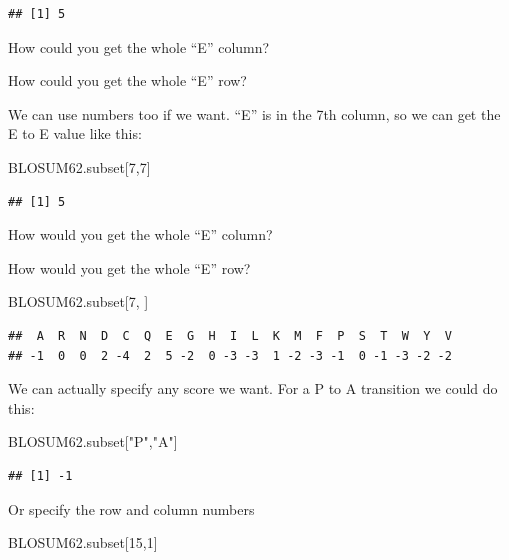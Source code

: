 \documentclass[
]{book}
\newenvironment{Shaded}{\begin{snugshade}}{\end{snugshade}}
\newcommand{\DecValTok}[1]{\textcolor[rgb]{0.00,0.00,0.81}{#1}}
\newcommand{\NormalTok}[1]{#1}
\newcommand{\StringTok}[1]{\textcolor[rgb]{0.31,0.60,0.02}{#1}}
\begin{document}
\begin{verbatim}
## [1] 5
\end{verbatim}

How could you get the whole ``E'' column?

How could you get the whole ``E'' row?

We can use numbers too if we want. ``E'' is in the 7th column, so we can get the E to E value like this:

\begin{Shaded}
\begin{Highlighting}[]
\NormalTok{BLOSUM62.subset[}\DecValTok{7}\NormalTok{,}\DecValTok{7}\NormalTok{]}
\end{Highlighting}
\end{Shaded}

\begin{verbatim}
## [1] 5
\end{verbatim}

How would you get the whole ``E'' column?

How would you get the whole ``E'' row?

\begin{Shaded}
\begin{Highlighting}[]
\NormalTok{BLOSUM62.subset[}\DecValTok{7}\NormalTok{, ]}
\end{Highlighting}
\end{Shaded}

\begin{verbatim}
##  A  R  N  D  C  Q  E  G  H  I  L  K  M  F  P  S  T  W  Y  V 
## -1  0  0  2 -4  2  5 -2  0 -3 -3  1 -2 -3 -1  0 -1 -3 -2 -2
\end{verbatim}

We can actually specify any score we want. For a P to A transition we could do this:

\begin{Shaded}
\begin{Highlighting}[]
\NormalTok{BLOSUM62.subset[}\StringTok{"P"}\NormalTok{,}\StringTok{"A"}\NormalTok{]}
\end{Highlighting}
\end{Shaded}

\begin{verbatim}
## [1] -1
\end{verbatim}

Or specify the row and column numbers

\begin{Shaded}
\begin{Highlighting}[]
\NormalTok{BLOSUM62.subset[}\DecValTok{15}\NormalTok{,}\DecValTok{1}\NormalTok{]}
\end{Highlighting}
\end{Shaded}
\end{document}
